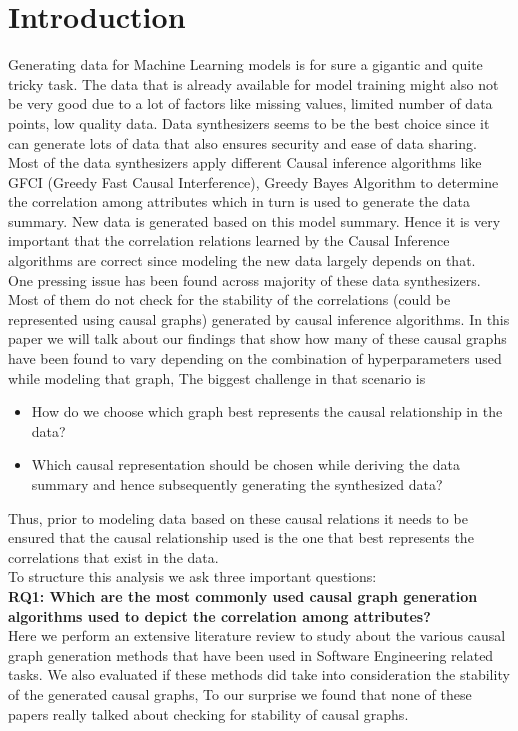 \documentclass[sigconf,review,anonymous,nonacm=true]{acmart}
\begin{document}
\section{Introduction}
Generating data for Machine Learning models is for sure a gigantic and quite tricky task. The data that is already available for model training might also not be very good due to a lot of factors like missing values, limited number of data points, low quality data. Data synthesizers seems to be the best choice since it can generate lots of data that also ensures security and ease of data sharing. Most of the data synthesizers apply different Causal inference algorithms like GFCI (Greedy Fast Causal Interference), Greedy Bayes Algorithm to determine the correlation among attributes which in turn is used to generate the data summary. New data is generated based on this model summary. Hence it is very important that the correlation relations learned by the Causal Inference algorithms are correct since modeling the new data largely depends on that.\\
One pressing issue has been found across majority of these data synthesizers. Most of them do not check for the stability of the correlations (could be represented using causal graphs) generated by causal inference algorithms. In this paper we will talk about our findings that show how many of these causal graphs have been found to vary depending on the combination of hyperparameters used while modeling that graph, The biggest challenge in that scenario is 
\begin{itemize}
    \item How do we choose which graph best represents the causal relationship in the data?
    \item Which causal representation should be chosen while deriving the data summary and hence subsequently generating the synthesized data? 
\end{itemize} 
Thus, prior to modeling data based on these causal relations it needs to be ensured that the causal relationship used is the one that best represents the correlations that exist in the data.\\
To structure this analysis we ask three important questions:\\
\textbf{RQ1: Which are the most commonly used causal graph generation algorithms used to depict the correlation among attributes?}\\
Here we perform an extensive literature review to study about the various causal graph generation methods that have been used in Software Engineering related tasks. We also evaluated if these methods did take into consideration the stability of the generated causal graphs, To our surprise we found that none of these papers really talked about checking for stability of causal graphs.\\
\end{document}

